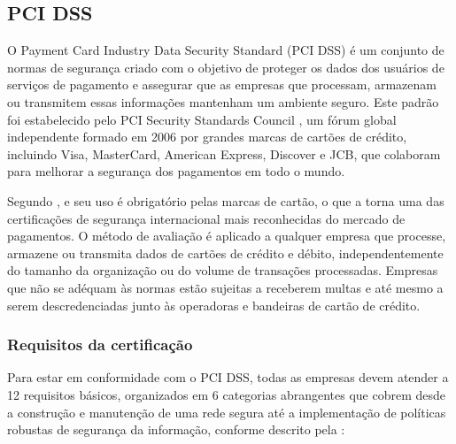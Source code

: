     \subsection{PCI DSS}
    \label{pci}

    O Payment Card Industry Data Security Standard (PCI DSS) é um conjunto de normas de segurança criado com o objetivo de proteger os dados dos usuários de serviços de pagamento e assegurar que as empresas que processam, armazenam ou transmitem essas informações mantenham um ambiente seguro. Este padrão foi estabelecido pelo PCI Security Standards Council \cite{pci2022}, um fórum global independente formado em 2006 por grandes marcas de cartões de crédito, incluindo Visa, MasterCard, American Express, Discover e JCB, que colaboram para melhorar a segurança dos pagamentos em todo o mundo.
    
    Segundo , e seu uso é obrigatório pelas marcas de cartão, o que a torna uma das certificações de segurança internacional mais reconhecidas do mercado de pagamentos. O método de avaliação é aplicado a qualquer empresa que processe, armazene ou transmita dados de cartões de crédito e débito, independentemente do tamanho da organização ou do volume de transações processadas. Empresas que não se adéquam às normas estão sujeitas a receberem multas e até mesmo a serem descredenciadas junto às operadoras e bandeiras de cartão de crédito.

    \subsubsection{Requisitos da certificação}
    Para estar em conformidade com o PCI DSS, todas as empresas devem atender a 12 requisitos básicos, organizados em 6 categorias abrangentes que cobrem desde a construção e manutenção de uma rede segura até a implementação de políticas robustas de segurança da informação, conforme descrito pela :
    
